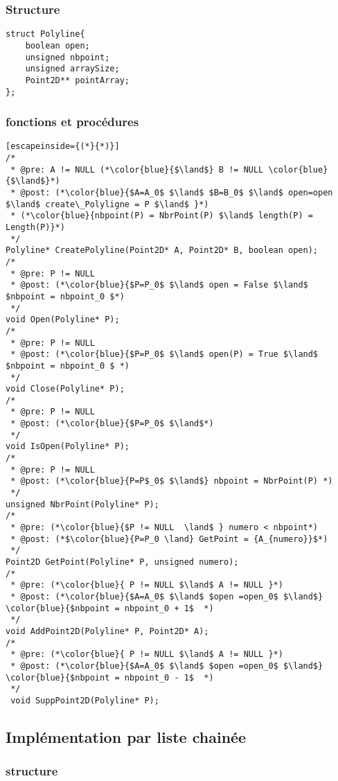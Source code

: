\documentclass[a4paper, 11pt, oneside]{article}
\begin{document}
\subsubsection{Structure}

\begin{lstlisting}
struct Polyline{
	boolean open;
	unsigned nbpoint;
	unsigned arraySize;
	Point2D** pointArray;
};
\end{lstlisting}

\subsubsection{fonctions et procédures}

\begin{lstlisting}[escapeinside={(*}{*)}]
/* 
 * @pre: A != NULL (*\color{blue}{$\land$} B != NULL \color{blue}{$\land$}*)
 * @post: (*\color{blue}{$A=A_0$ $\land$ $B=B_0$ $\land$ open=open $\land$ create\_Polyligne = P $\land$ }*)
 * (*\color{blue}{nbpoint(P) = NbrPoint(P) $\land$ length(P) = Length(P)}*)
 */
Polyline* CreatePolyline(Point2D* A, Point2D* B, boolean open);
/* 
 * @pre: P != NULL 
 * @post: (*\color{blue}{$P=P_0$ $\land$ open = False $\land$  $nbpoint = nbpoint_0 $*)
 */
void Open(Polyline* P);
/* 
 * @pre: P != NULL 
 * @post: (*\color{blue}{$P=P_0$ $\land$ open(P) = True $\land$ $nbpoint = nbpoint_0 $ *)
 */
void Close(Polyline* P);
/* 
 * @pre: P != NULL 
 * @post: (*\color{blue}{$P=P_0$ $\land$*)
 */
void IsOpen(Polyline* P);
/* 
 * @pre: P != NULL
 * @post: (*\color{blue}{P=P$_0$ $\land$} nbpoint = NbrPoint(P) *)
 */
unsigned NbrPoint(Polyline* P);
/* 
 * @pre: (*\color{blue}{$P != NULL  \land$ } numero < nbpoint*)
 * @post: (*$\color{blue}{P=P_0 \land} GetPoint = {A_{numero}}$*)
 */
Point2D GetPoint(Polyline* P, unsigned numero);
/*
 * @pre: (*\color{blue}{ P != NULL $\land$ A != NULL }*)
 * @post: (*\color{blue}{$A=A_0$ $\land$ $open =open_0$ $\land$} \color{blue}{$nbpoint = nbpoint_0 + 1$  *)
 */
void AddPoint2D(Polyline* P, Point2D* A);
/*
 * @pre: (*\color{blue}{ P != NULL $\land$ A != NULL }*)
 * @post: (*\color{blue}{$A=A_0$ $\land$ $open =open_0$ $\land$} \color{blue}{$nbpoint = nbpoint_0 - 1$  *)
 */
 void SuppPoint2D(Polyline* P);
\end{lstlisting}

\subsection{Implémentation par liste chainée}

\subsubsection{structure}
\end{document}
